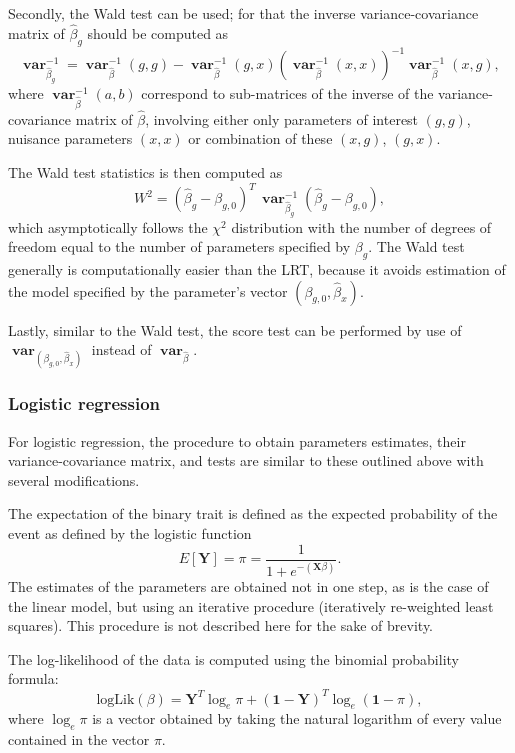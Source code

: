 \documentclass[12pt,a4paper]{article}
\DeclareMathOperator{\var}{\mathbf{var}}
\begin{document}
Secondly, the Wald test can be used; for that the inverse
variance-covariance matrix of $\hat{\beta}_g$ should be computed as
$$
\var_{\hat{\beta}_g}^{-1} = \var_{\hat{\beta}}^{-1}(g,g) -
\var_{\hat{\beta}}^{-1}(g,x) \left(
  \var_{\hat{\beta}}^{-1}(x,x) \right)^{-1}
  \var_{\hat{\beta}}^{-1}(x,g),
$$
where $\var_{\hat{\beta}}^{-1}(a,b)$ correspond to sub-matrices of the
inverse of the variance-covariance matrix of $\hat{\beta}$, involving
either only parameters of interest $(g,g)$, nuisance parameters
$(x,x)$ or combination of these $(x,g)$, $(g,x)$.

The Wald test statistics is then computed as
$$
W^2 = (\hat{\beta}_g - \beta_{g,0})^T \,
\var_{\hat{\beta}_g}^{-1} (\hat{\beta}_g - \beta_{g,0}),
$$
which asymptotically follows the $\chi^2$ distribution with the number
of degrees of freedom equal to the number of parameters specified by
$\beta_g$. The Wald test generally is computationally easier than the
LRT, because it avoids estimation of the model specified by the
parameter's vector $(\beta_{g,0},\hat{\beta}_x)$.

Lastly, similar to the Wald test, the score test can be performed by use
of $\var_{(\beta_{g,0},\hat{\beta}_x)}$ instead of $\var_{\hat{\beta}}$.


\subsubsection{Logistic regression}
For logistic regression, the procedure to obtain
parameters estimates, their variance-covariance matrix, and tests are
similar to these outlined above with several modifications.

The expectation of the binary trait is defined as the expected
probability of the event as defined by the logistic
function
$$
E[\mathbf{Y}] = \pi = \frac{ 1 }{ 1 + e^{-(\mathbf{X}\beta)} }.
$$
The estimates of the parameters are obtained not in one
step, as is the case of the linear model, but using an iterative
procedure (iteratively re-weighted least squares). This
procedure is not described here for the sake of brevity.

The log-likelihood of the data is computed using the
binomial probability formula:
$$
\mathrm{logLik}(\beta) = \mathbf{Y}^T \log_e \pi + (\mathbf{1} -
\mathbf{Y})^T \log_e (\mathbf{1}-\pi),
$$
where $\log_e \pi$ is a vector obtained by taking the natural
logarithm of every value contained in the vector $\pi$.
\end{document}
